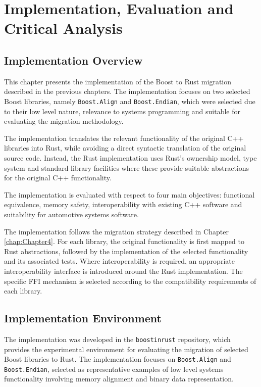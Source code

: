 \chapter{Implementation, Evaluation and Critical Analysis}
\label{chap:Chapter6}

\section{Implementation Overview}

This chapter presents the implementation of the Boost to Rust migration described in the previous chapters.
The implementation focuses on two selected Boost libraries, namely \texttt{Boost.Align} and \texttt{Boost.Endian},
which were selected due to their low level nature, 
relevance to systems programming and suitable for evaluating the migration methodology. 

The implementation translates the relevant functionality of the original C++ libraries into Rust, 
while avoiding a direct syntactic translation of the original source code.
Instead, the Rust implementation uses Rust's ownership model, type system and standard library facilities where these
provide suitable abstractions for the original C++ functionality.

The implementation is evaluated with respect to four main objectives: functional equivalence, memory safety,
interoperability with existing C++ software and suitability for automotive systems software.

The implementation follows the migration strategy described in Chapter \ref{chap:Chapter4}.
For each library, the original functionality is first mapped to Rust abstractions, followed by the implementation 
of the selected functionality and its associated tests. Where interoperability is required, 
an appropriate interoperability interface is introduced around the Rust implementation. The specific
FFI mechanism is selected according to the compatibility requirements of each library.

\section{Implementation Environment}

The implementation was developed in the \texttt{boostinrust} repository, which provides the experimental environment 
for evaluating the migration of selected Boost libraries to Rust. The implementation focuses on \texttt{Boost.Align} 
and \texttt{Boost.Endian}, selected as representative examples of low level systems functionality involving 
memory alignment and binary data representation. 

